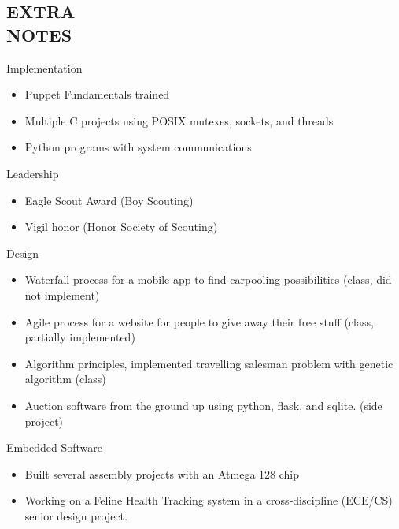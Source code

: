 \documentclass[mm]{res}
\begin{document}
\begin{resume}
\section{EXTRA \\ NOTES}     
	Implementation
		\begin{itemize}
			\item Puppet Fundamentals trained
			\item Multiple C projects using POSIX mutexes, sockets, and threads
			\item Python programs with system communications
		\end{itemize}    
            Leadership
		\begin{itemize}
			\item Eagle Scout Award (Boy Scouting)
			\item Vigil honor (Honor Society of Scouting)
		\end{itemize}
	Design
		\begin{itemize}
			\item Waterfall process for a mobile app to find carpooling possibilities (class, did not implement)
			\item Agile process for a website for people to give away their free stuff (class, partially implemented)
			\item Algorithm principles, implemented travelling salesman problem with genetic algorithm (class)
      \item Auction software from the ground up using python, flask, and sqlite. (side project)
		\end{itemize}
	Embedded Software
		\begin{itemize}
			\item Built several assembly projects with an Atmega 128 chip
      \item Working on a Feline Health Tracking system in a cross-discipline (ECE/CS) senior design project.
 		\end{itemize}

\end{resume}
\end{document}

